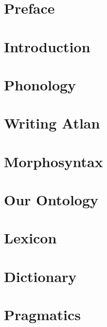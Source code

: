 \documentclass[ twoside, openany, 12pt, a5paper]{book}
\begin{document}
\frontmatter


\chapter{Preface}




\mainmatter

\chapter{Introduction}

\chapter{Phonology}

\chapter{Writing Atlan}

\chapter{Morphosyntax}

\chapter{Our Ontology}

\chapter{Lexicon}

\chapter{Dictionary}

\chapter{Pragmatics}
\end{document}
